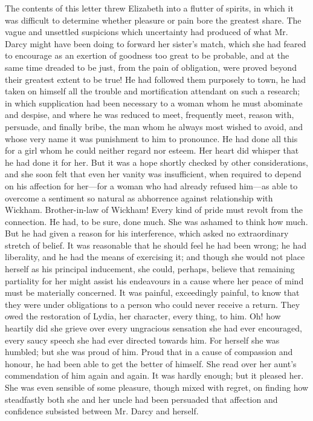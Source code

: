 The contents of this letter threw Elizabeth into a flutter of spirits, in which it was difficult to determine whether pleasure or pain bore the greatest share. The vague and unsettled suspicions which uncertainty had produced of what Mr. Darcy might have been doing to forward her sister's match, which she had feared to encourage as an exertion of goodness too great to be probable, and at the same time dreaded to be just, from the pain of obligation, were proved beyond their greatest extent to be true! He had followed them purposely to town, he had taken on himself all the trouble and mortification attendant on such a research; in which supplication had been necessary to a woman whom he must abominate and despise, and where he was reduced to meet, frequently meet, reason with, persuade, and finally bribe, the man whom he always most wished to avoid, and whose very name it was punishment to him to pronounce. He had done all this for a girl whom he could neither regard nor esteem. Her heart did whisper that he had done it for her. But it was a hope shortly checked by other considerations, and she soon felt that even her vanity was insufficient, when required to depend on his affection for her---for a woman who had already refused him---as able to overcome a sentiment so natural as abhorrence against relationship with Wickham. Brother-in-law of Wickham! Every kind of pride must revolt from the connection. He had, to be sure, done much. She was ashamed to think how much. But he had given a reason for his interference, which asked no extraordinary stretch of belief. It was reasonable that he should feel he had been wrong; he had liberality, and he had the means of exercising it; and though she would not place herself as his principal inducement, she could, perhaps, believe that remaining partiality for her might assist his endeavours in a cause where her peace of mind must be materially concerned. It was painful, exceedingly painful, to know that they were under obligations to a person who could never receive a return. They owed the restoration of Lydia, her character, every thing, to him. Oh! how heartily did she grieve over every ungracious sensation she had ever encouraged, every saucy speech she had ever directed towards him. For herself she was humbled; but she was proud of him. Proud that in a cause of compassion and honour, he had been able to get the better of himself. She read over her aunt's commendation of him again and again. It was hardly enough; but it pleased her. She was even sensible of some pleasure, though mixed with regret, on finding how steadfastly both she and her uncle had been persuaded that affection and confidence subsisted between Mr. Darcy and herself.

